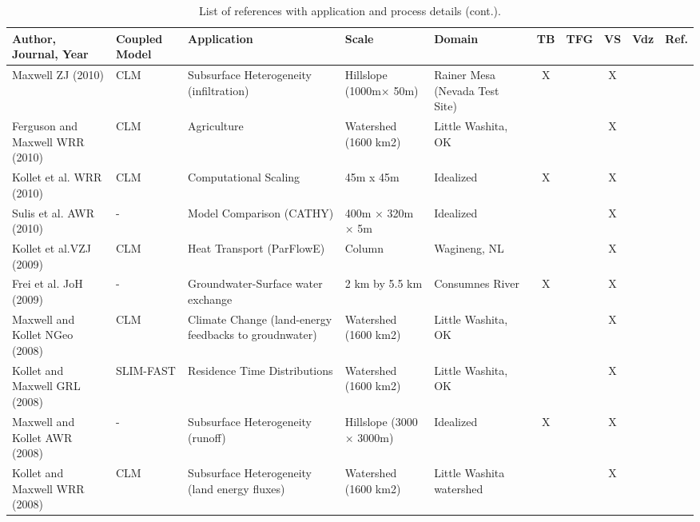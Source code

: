 {\begin{table} \center
\renewcommand{\arraystretch}{2.5}
\center

\caption{List of \parflow{} references with application and process details (cont.).}

\begin{tabular}{ l  p{1.5cm} p{2cm} p{1.5cm} p{1.5cm} | c | c | c | c | c }
\bf{Author, Journal, Year} & \bf{Coupled Model} & \bf{Application} & \bf{Scale} & \bf{Domain} & \bf{TB} & \bf{TFG} & \bf{VS} & \bf{Vdz} & \bf{Ref.} \\   
\hline{}
   
Maxwell ZJ (2010) & CLM & Subsurface Heterogeneity (infiltration) & Hillslope (1000m× 50m) & Rainer Mesa (Nevada Test Site) & X &  & X & & \cite{Maxwell10}    \\
Ferguson and Maxwell WRR (2010) & CLM & Agriculture & Watershed (1600 km2) & Little Washita, OK &  &  & X & & \cite{Ferguson10}  \\
Kollet et al. WRR (2010) & CLM & Computational Scaling & 45m x 45m & Idealized & X &  & X & & \cite{Kollet10} \\
Sulis et al. AWR (2010) & - & Model Comparison (CATHY) & 400m × 320m × 5m & Idealized &  &  & X & & \cite{Sulis10}  \\
Kollet et al.VZJ (2009) & CLM & Heat Transport (ParFlowE) & Column & Wagineng, NL &  &  & X & & \cite{Kollet09}   \\
Frei et al. JoH (2009) & - & Groundwater-Surface water exchange & 2 km by 5.5 km & Consumnes River & X &  & X & & \cite{Frie09} \\
Maxwell and Kollet NGeo (2008) & CLM & Climate Change (land-energy feedbacks to groudnwater) & Watershed (1600 km2) & Little Washita, OK &  &  & X & & \cite{MK08a}  \\
Kollet and Maxwell GRL (2008) & SLIM-FAST & Residence Time Distributions  & Watershed (1600 km2) & Little Washita, OK &  &  & X & & \cite{KM08b} \\
Maxwell and Kollet AWR (2008) & - & Subsurface Heterogeneity (runoff) & Hillslope (3000  × 3000m) & Idealized & X &  & X & & \cite{MK08b} \\
Kollet and Maxwell WRR (2008) & CLM & Subsurface Heterogeneity (land energy fluxes) & Watershed (1600 km2) & Little Washita watershed &  &  & X & & \cite{KM08a} \\
\end{tabular}
\label{pfref3}
\end{table}

\begin{table} \center
\renewcommand{\arraystretch}{2.5}
\center


\end{table}}

